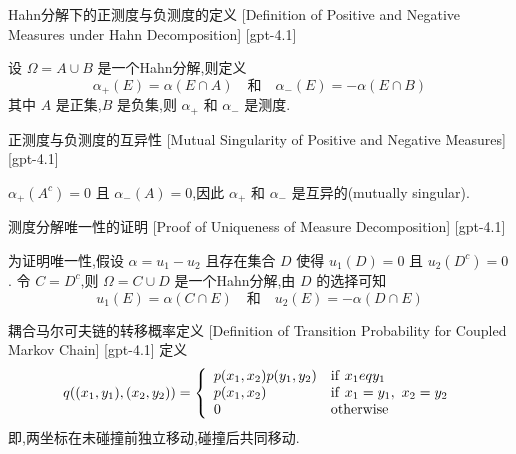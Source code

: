 \documentclass[UTF8]{ctexart}
\begin{document}
    
    
    \begin{dfn}
        {Hahn分解下的正测度与负测度的定义}
        [Definition of Positive and Negative Measures under Hahn Decomposition]
        [gpt-4.1]
        
设 $\Omega = A \cup B$ 是一个Hahn分解,则定义
\[
\alpha_{+}(E) = \alpha(E \cap A) \quad \text{和} \quad \alpha_{-}(E) = -\alpha(E \cap B)
\]
其中 $A$ 是正集,$B$ 是负集,则 $\alpha_{+}$ 和 $\alpha_{-}$ 是测度.

    \end{dfn}
    
    
    
    \begin{ppt}
        {正测度与负测度的互异性}
        [Mutual Singularity of Positive and Negative Measures]
        [gpt-4.1]
        
$\alpha_{+}(A^{c}) = 0$ 且 $\alpha_{-}(A) = 0$,因此 $\alpha_{+}$ 和 $\alpha_{-}$ 是互异的(mutually singular).

    \end{ppt}
    
    
    
    \begin{prf}
        {测度分解唯一性的证明}
        [Proof of Uniqueness of Measure Decomposition]
        [gpt-4.1]
        
为证明唯一性,假设 $\alpha = 
u_{1} - 
u_{2}$ 且存在集合 $D$ 使得 $
u_{1}(D) = 0$ 且 $
u_{2}(D^{c}) = 0$.
令 $C = D^{c}$,则 $\Omega = C \cup D$ 是一个Hahn分解,由 $D$ 的选择可知
\[
u_{1}(E) = \alpha(C \cap E) \quad \text{和} \quad 
u_{2}(E) = -\alpha(D \cap E)
\]

    \end{prf}
    
    
    
    \begin{dfn}
        {耦合马尔可夫链的转移概率定义}
        [Definition of Transition Probability for Coupled Markov Chain]
        [gpt-4.1]
        定义
\[
q ( ( x _ { 1 } , y _ { 1 } ) , ( x _ { 2 } , y _ { 2 } ) ) = \left\{ \begin{array} { l l } { p ( x _ { 1 } , x _ { 2 } ) p ( y _ { 1 } , y _ { 2 } ) } & { \mathrm { if } \ x _ { 1 } 
eq y _ { 1 } } \\ { p ( x _ { 1 } , x _ { 2 } ) } & { \mathrm { if } \ x _ { 1 } = y _ { 1 } ,\ x _ { 2 } = y _ { 2 } } \\ { 0 } & { \mathrm { otherwise } } \end{array} \right.
\]
即,两坐标在未碰撞前独立移动,碰撞后共同移动.
    \end{dfn}
    
\end{document}
